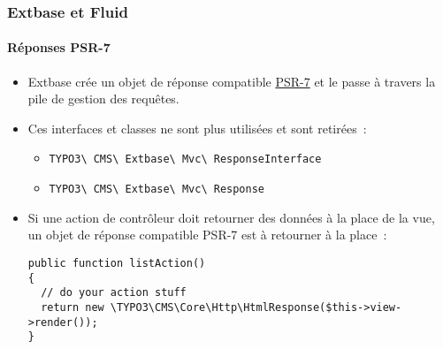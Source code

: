 %

\begin{frame}[fragile]
	\frametitle{Extbase et Fluid}
	\framesubtitle{Réponses PSR-7}

	\lstset{basicstyle=\tiny\ttfamily}

	\begin{itemize}
		\item Extbase crée un objet de réponse compatible
			\href{https://www.php-fig.org/psr/psr-7/}{PSR-7}
			et le passe à travers la pile de gestion des requêtes.
		\item Ces interfaces et classes ne sont plus utilisées et sont retirées~:

			\begin{itemize}\smaller
				\item \texttt{TYPO3\textbackslash
					CMS\textbackslash
					Extbase\textbackslash
					Mvc\textbackslash
					ResponseInterface}
				\item \texttt{TYPO3\textbackslash
					CMS\textbackslash
					Extbase\textbackslash
					Mvc\textbackslash
					Response}
			\end{itemize}\normalsize

		\item Si une action de contrôleur doit retourner des données à la place de la vue, un
			objet de réponse compatible PSR-7 est à retourner à la place~:
\begin{lstlisting}
public function listAction()
{
  // do your action stuff
  return new \TYPO3\CMS\Core\Http\HtmlResponse($this->view->render());
}
\end{lstlisting}
	\end{itemize}

\end{frame}


